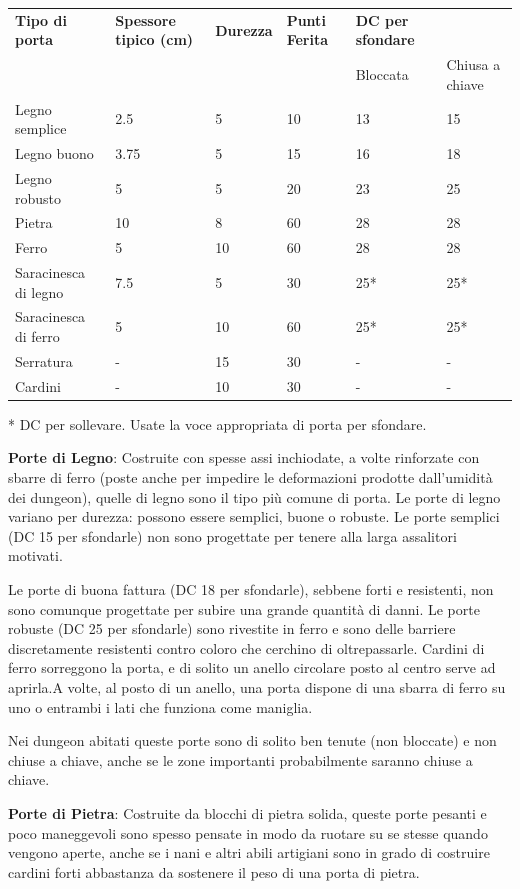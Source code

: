 \documentclass[a4paper,11pt,twoside,openany]{book}
\begin{document}
\begin{tabularx}{0.95\textwidth}{llllll}
	\toprule
	\textbf{Tipo di porta} & \textbf{Spessore tipico (cm)} & \textbf{Durezza} & \textbf{Punti Ferita} & \textbf{DC per sfondare} \\
    &&   &   & Bloccata  & Chiusa a chiave\\
	Legno semplice    & 2.5  & 5 & 10& 13   & 15\\
	Legno buono  & 3.75 & 5 & 15& 16   & 18\\
	Legno robusto& 5    & 5 & 20& 23   & 25\\
	Pietra  & 10   & 8 & 60& 28   & 28\\
	Ferro   & 5    & 10& 60& 28   & 28\\
	Saracinesca di legno   & 7.5  & 5 & 30& 25{*}& 25{*}\\
	Saracinesca di ferro   & 5    & 10& 60& 25{*}& 25{*}\\
	Serratura    & -    & 15& 30& -    & -\\
	Cardini & -    & 10& 30& -    & -\\
\end{tabularx}

{*} DC per sollevare. Usate la voce appropriata di porta per sfondare.

\bigskip

\textbf{Porte di Legno}: Costruite con spesse assi inchiodate, a volte rinforzate con sbarre di ferro (poste anche per impedire le deformazioni prodotte dall'umidità dei dungeon), quelle di legno sono il tipo più comune di porta. Le porte di legno variano per durezza: possono essere semplici, buone o robuste. Le porte semplici (DC 15 per sfondarle) non sono progettate per tenere alla larga assalitori motivati.

Le porte di buona fattura (DC 18 per sfondarle), sebbene forti e resistenti, non sono comunque progettate per subire una grande quantità di danni. Le porte robuste (DC 25 per sfondarle) sono rivestite in ferro e sono delle barriere discretamente resistenti contro coloro che cerchino di oltrepassarle. Cardini di ferro sorreggono la porta, e di solito un anello circolare posto al centro serve ad aprirla.A volte, al posto di un anello, una porta dispone di una sbarra di ferro su uno o entrambi i lati che funziona come maniglia.

Nei dungeon abitati queste porte sono di solito ben tenute (non bloccate) e non chiuse a chiave, anche se le zone importanti probabilmente saranno chiuse a chiave.

\textbf{Porte di Pietra}: Costruite da blocchi di pietra solida, queste porte pesanti e poco maneggevoli sono spesso pensate in modo da ruotare su se stesse quando vengono aperte, anche se i nani e altri abili artigiani sono in grado di costruire cardini forti abbastanza da sostenere il peso di una porta di pietra.
\end{document}
